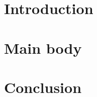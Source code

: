 \documentclass[a4paper,11pt]{article}
\begin{document}
\section{Introduction}

\section{Main body}

\section{Conclusion}
\end{document}
